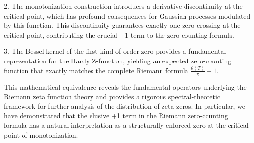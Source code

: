 \documentclass{article}
\theoremstyle{definition}
\begin{document}
2. The monotonization construction introduces a derivative discontinuity at the critical point, which has profound consequences for Gaussian processes modulated by this function. This discontinuity guarantees exactly one zero crossing at the critical point, contributing the crucial +1 term to the zero-counting formula.

3. The Bessel kernel of the first kind of order zero provides a fundamental representation for the Hardy Z-function, yielding an expected zero-counting function that exactly matches the complete Riemann formula $\frac{\theta(T)}{\pi} + 1$.

This mathematical equivalence reveals the fundamental operators underlying the Riemann zeta function theory and provides a rigorous spectral-theoretic framework for further analysis of the distribution of zeta zeros. In particular, we have demonstrated that the elusive +1 term in the Riemann zero-counting formula has a natural interpretation as a structurally enforced zero at the critical point of monotonization.
\end{document}
